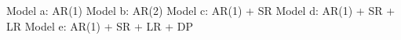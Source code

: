 \begin{table}
\begin{adjustbox}{width=\textwidth,totalheight=\textheight,keepaspectratio}
\begin{threeparttable}
\begin{tablenotes}
    \newline Model a: AR(1)
    \newline Model b: AR(2)
    \newline Model c: AR(1) + SR
    \newline Model d: AR(1) + SR + LR
    \newline Model e: AR(1) + SR + LR + DP
    \end{tablenotes}
    \end{threeparttable}
    \end{adjustbox}
\end{table}
